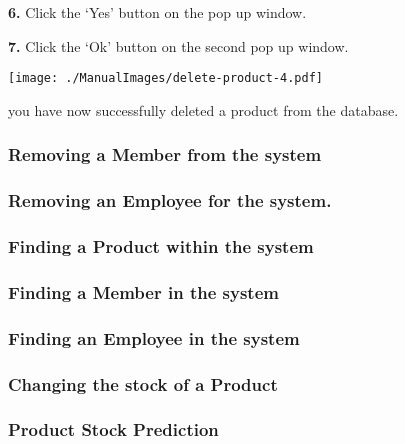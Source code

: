 \textbf{6.} Click the `Yes' button on the pop up window.

\textbf{7.} Click the `Ok' button on the second pop up window.

\texttt{[image: ./ManualImages/delete-product-4.pdf]}

you have now successfully deleted a product from the database.




\pagebreak
\subsubsection{Removing a Member from the system}
\label{fig:Removing a Member from the system}


\pagebreak
\subsubsection{Removing an Employee for the system.}
\label{fig:Removing an Employee for the system.}


\pagebreak
\subsubsection{Finding a Product within the system}
\label{fig:Finding a Product within the system}


\pagebreak
\subsubsection{Finding a Member in the system}
\label{fig:Finding a Member in the system}


\pagebreak
\subsubsection{Finding an Employee in the system}
\label{fig:Finding an Employee in the system}


\pagebreak
\subsubsection{Changing the stock of a Product}
\label{fig:Changing the stock of a Product}


\pagebreak
\subsubsection{Product Stock Prediction}
\label{fig:Product Stock Prediction}


